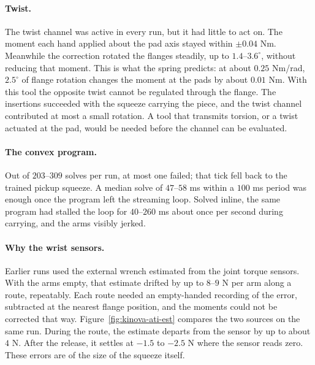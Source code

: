 \paragraph{Twist.} The twist channel was active in every run, but it had little to act on. The moment each hand applied about the pad axis stayed within $\pm0.04$ Nm. Meanwhile the correction rotated the flanges steadily, up to $1.4$--$3.6^\circ$, without reducing that moment. This is what the spring predicts: at about $0.25$ Nm/rad, $2.5^\circ$ of flange rotation changes the moment at the pads by about $0.01$ Nm. With this tool the opposite twist cannot be regulated through the flange. The insertions succeeded with the squeeze carrying the piece, and the twist channel contributed at most a small rotation. A tool that transmits torsion, or a twist actuated at the pad, would be needed before the channel can be evaluated.

\paragraph{The convex program.} Out of $203$--$309$ solves per run, at most one failed; that tick fell back to the trained pickup squeeze. A median solve of $47$--$58$ ms within a $100$ ms period was enough once the program left the streaming loop. Solved inline, the same program had stalled the loop for $40$--$260$ ms about once per second during carrying, and the arms visibly jerked.

\paragraph{Why the wrist sensors.} Earlier runs used the external wrench estimated from the joint torque sensors. With the arms empty, that estimate drifted by up to $8$--$9$ N per arm along a route, repeatably. Each route needed an empty-handed recording of the error, subtracted at the nearest flange position, and the moments could not be corrected that way. Figure~\ref{fig:kinova-ati-est} compares the two sources on the same run. During the route, the estimate departs from the sensor by up to about $4$ N. After the release, it settles at $-1.5$ to $-2.5$ N where the sensor reads zero. These errors are of the size of the squeeze itself.


